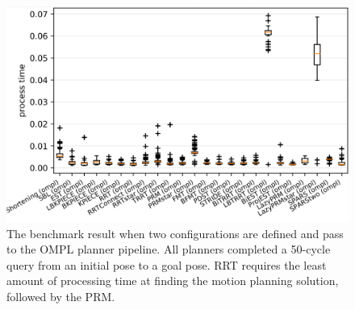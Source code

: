 \begin{figure}
  \centering
  \captionsetup{justification=centering}
  \includegraphics[width=\linewidth]{benchmarking_process_time.png}
  \caption{The benchmark result when two configurations are defined and pass to 
  the OMPL planner pipeline. All planners completed a 50-cycle query from an initial
  pose to a goal pose. RRT requires the least amount of processing time at finding
  the motion planning solution, followed by the PRM.}
  \label{fig:benchmarking_process_time}
\end{figure}

